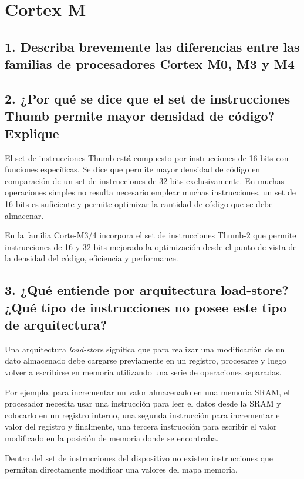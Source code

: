\documentclass[10pt,a4paper,twoside,spanish]{article}	%
\begin{document}
\section*{Cortex M}

\subsection*{1. Describa brevemente las diferencias entre las familias de procesadores Cortex M0, M3 y M4}

\subsection*{2. ¿Por qué se dice que el set de instrucciones Thumb permite mayor densidad de código? Explique}

El set de instrucciones Thumb está compuesto por instrucciones de 16 bits con funciones específicas. Se dice que permite mayor densidad de código en comparación de un set de instrucciones de 32 bits exclusivamente. En muchas operaciones simples no resulta necesario emplear muchas instrucciones, un set de 16 bits es suficiente y permite optimizar la cantidad de código que se debe almacenar. 

En la familia Corte-M3/4 incorpora el set de instrucciones Thumb-2 que permite instrucciones de 16 y 32 bits mejorado la optimización desde el punto de vista de la densidad del código, eficiencia y performance. 
     

\subsection*{3. ¿Qué entiende por arquitectura load-store? ¿Qué tipo de instrucciones no posee este tipo de arquitectura?}


Una arquitectura \textit{load-store} significa que para realizar una modificación de un dato almacenado debe cargarse previamente en un registro, procesarse y luego volver a escribirse en memoria utilizando una serie de operaciones separadas. 

Por ejemplo, para incrementar un valor almacenado en una memoria SRAM, el procesador necesita usar una instrucción para leer el datos desde la SRAM y colocarlo en un registro interno, una segunda instrucción para incrementar el valor del registro y finalmente, una tercera instrucción para escribir el valor modificado en la posición de memoria donde se encontraba.  

Dentro del set de instrucciones del dispositivo no existen instrucciones que permitan directamente modificar una valores del mapa memoria.
\end{document}
